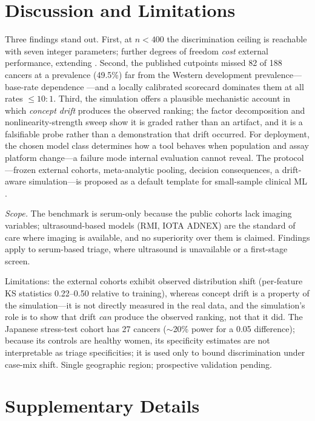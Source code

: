 \documentclass[pmlr,twocolumn,10pt]{jmlr} %
\begin{document}
\section{Discussion and Limitations}

Three findings stand out. First, at $n<400$ the discrimination ceiling
is reachable with seven integer parameters; further degrees of freedom
\emph{cost} external performance, extending \citep{christodoulou2019}.
Second, the published cutpoints missed 82 of 188 cancers at a prevalence
(49.5\%) far from the Western development prevalence---base-rate
dependence \citep{rolfsen2020}---and a locally calibrated scorecard
dominates them at all rates $\le10{:}1$. Third, the simulation offers a
plausible mechanistic account in which \emph{concept drift} produces the
observed ranking; the factor decomposition and nonlinearity-strength sweep
show it is graded rather than an artifact, and it is a falsifiable probe
rather than a demonstration that drift occurred.
For deployment, the chosen model class determines how a tool behaves
when population and assay platform change---a failure mode internal
evaluation cannot reveal. The protocol---frozen external cohorts, meta-analytic pooling, decision
consequences, a drift-aware simulation---is proposed as a default template
for small-sample clinical ML \citep{collins2015}.

\emph{Scope.} The benchmark is serum-only because the public cohorts lack
imaging variables; ultrasound-based models (RMI, IOTA ADNEX) are the
standard of care where imaging is available, and no superiority over them
is claimed. Findings apply to serum-based triage, where ultrasound is
unavailable or a first-stage screen.

Limitations: the external cohorts exhibit observed distribution shift
(per-feature KS statistics 0.22--0.50 relative to training), whereas
concept drift is a property of the simulation---it is not directly measured
in the real data, and the simulation's role is to show that drift
\emph{can} produce the observed ranking, not that it did. The Japanese
stress-test cohort has 27 cancers ($\sim$20\% power for a 0.05 difference);
because its controls are healthy women, its specificity estimates are not
interpretable as triage specificities; it is used only to bound
discrimination under case-mix shift. Single geographic region; prospective
validation pending.



\appendix

\section{Supplementary Details}
\end{document}
